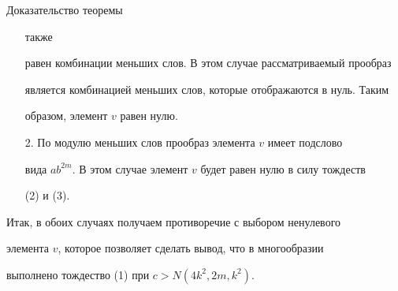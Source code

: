 \begin{pf*}{Доказательство теоремы}
\begin{itemize}
также


равен комбинации меньших слов. В этом случае рассматриваемый прообраз


является комбинацией меньших слов, которые отображаются в нуль. Таким


образом, элемент $v$ равен нулю.


\item[2.] По модулю меньших слов прообраз элемента $v$ имеет подслово


вида $ab^{2m}$. В этом случае элемент $v$ будет равен нулю в силу тождеств


(2) и (3).


\end{itemize}





Итак, в обоих случаях получаем противоречие с выбором ненулевого


элемента $v$, которое позволяет сделать вывод, что в многообразии


выполнено тождество (1) при $c>N(4k^2,2m,k^2)$.


\end{pf*}





